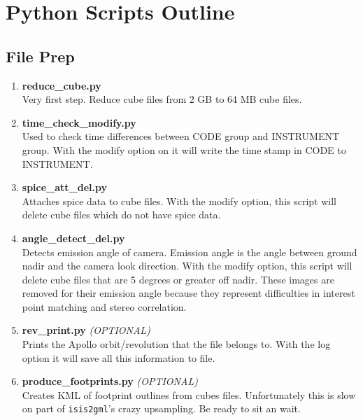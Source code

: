 \documentclass[12pt]{article}
\begin{document}
\section{Python Scripts Outline}

\subsection*{File Prep}

\begin{enumerate}

\item \textbf{reduce\_cube.py} \hfill \\
  Very first step. Reduce cube files from 2 GB to 64 MB cube files.

\item \textbf{time\_check\_modify.py} \hfill \\
  Used to check time differences between CODE group and INSTRUMENT group. With the modify option on it will write the time stamp in CODE to INSTRUMENT.

\item \textbf{spice\_att\_del.py} \hfill \\
  Attaches spice data to cube files. With the modify option, this script will delete cube files which do not have spice data.

\item \textbf{angle\_detect\_del.py} \hfill \\
  Detects emission angle of camera. Emission angle is the angle between ground nadir and the camera look direction. With the modify option, this script will delete cube files that are 5 degrees or greater off nadir. These images are removed for their emission angle because they represent difficulties in interest point matching and stereo correlation.

\item \textbf{rev\_print.py} \emph{(OPTIONAL)} \hfill \\
  Prints the Apollo orbit/revolution that the file belongs to. With the log option it will save all this information to file.

\item \textbf{produce\_footprints.py} \emph{(OPTIONAL)} \hfill \\
  Creates KML of footprint outlines from cubes files. Unfortunately this is slow on part of \verb#isis2gml#'s crazy upsampling. Be ready to sit an wait.

\end{enumerate}
\end{document}
